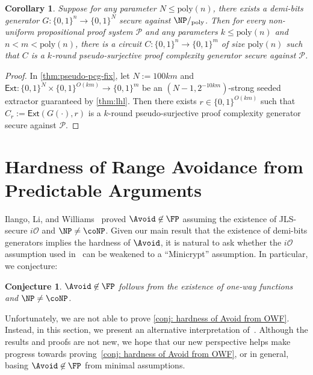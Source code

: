 \documentclass[10pt,a4paper]{article}
\newtheorem{corollary}[theorem]{Corollary}
\newtheorem{conjecture}[theorem]{Conjecture}
\theoremstyle{definition}
\theoremstyle{remark}
\renewcommand{\poly}{\mathrm{poly}}
\newcommand{\Ext}{\mathsf{Ext}}
\newcommand{\calP}{\mathcal{P}}
\newcommand{\iO}{i\mathcal{O}}
\begin{document}
\begin{corollary}\label{cor: pseudo-surjective}
    Suppose for any parameter $N\leq \poly(n)$, there exists a demi-bits generator $G: \{0,1\}^n \to \{0,1\}^N$ secure against $\NP/_\poly$. Then for every non-uniform propositional proof system $\calP$ and any parameters $k\leq\poly(n)$ and $n<m<\poly(n)$, there is a circuit $C: \{0,1\}^n \to \{0,1\}^m$ of size $\poly(n)$ such that $C$ is a $k$-round pseudo-surjective proof complexity generator secure against $\calP$. %
\end{corollary}
\begin{proof}
    In \autoref{thm:pseudo-pcg-fix}, let $N:=100km$ and $\Ext\colon\{0,1\}^N\times\{0,1\}^{O(km)}\to\{0,1\}^{m}$ be an $(N-1,2^{-10km})$-strong seeded extractor guaranteed by \autoref{thm:lhl}. Then there exists $r\in\{0,1\}^{O(km)}$ such that $C_r:=\Ext(G(\cdot),r)$ is a $k$-round pseudo-surjective proof complexity generator secure against $\calP$. %
\end{proof}

\section{Hardness of Range Avoidance from Predictable Arguments}\label{sec:ILW-interpretation}

Ilango, Li, and Williams~\cite{DBLP:conf/stoc/IlangoLW23} proved $\Avoid\not\in\FP$ assuming the existence of JLS-secure $\iO$ and $\NP\ne\coNP$. Given our main result that the existence of demi-bits generators implies the hardness of $\Avoid$, it is natural to ask whether the $\iO$ assumption used in~\cite{DBLP:conf/stoc/IlangoLW23} can be weakened to a ``Minicrypt'' assumption. In particular, we conjecture:
\begin{conjecture}\label{conj: hardness of Avoid from OWF}
    $\Avoid\not\in\FP$ follows from the existence of \emph{one-way functions} and $\NP\ne\coNP$.
\end{conjecture}

Unfortunately, we are not able to prove \autoref{conj: hardness of Avoid from OWF}. Instead, in this section, we present an alternative interpretation of~\cite{DBLP:conf/stoc/IlangoLW23}. Although the results and proofs are not new, we hope that our new perspective helps make progress towards proving~\autoref{conj: hardness of Avoid from OWF}, or in general, basing $\Avoid\not\in\FP$ from minimal assumptions.
\end{document}
